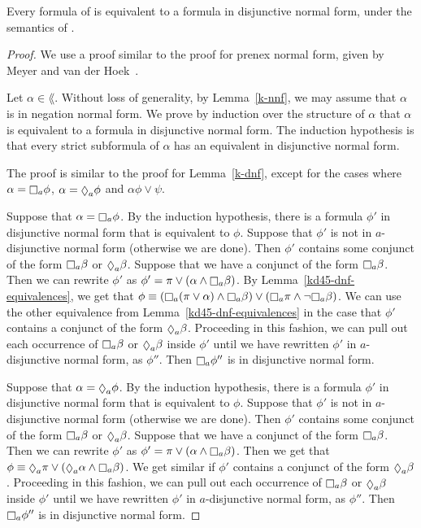 \begin{lemma}\label{kd45-dnf}
Every formula of \lang{} is equivalent to a formula in disjunctive normal form,
under the semantics of \logicKD{}.
\end{lemma}

\begin{proof}
We use a proof similar to the proof for prenex normal form, given by Meyer and
van der Hoek~\cite{meyer2004epistemic}.

Let $\alpha \in \lang$. Without loss of generality, by Lemma~\ref{k-nnf}, we may
assume that $\alpha$ is in negation normal form. We prove by induction over the
structure of $\alpha$ that $\alpha$ is equivalent to a formula in disjunctive
normal form. The induction hypothesis is that every strict subformula of
$\alpha$ has an equivalent in disjunctive normal form.

The proof is similar to the proof for Lemma~\ref{k-dnf}, except for the cases
where $\alpha = \knows_a \phi$, $\alpha = \suspects_a \phi$ and $\alpha \phi
\lor \psi$.

Suppose that $\alpha = \knows_a \phi$. By the induction hypothesis, there is a
formula $\phi'$ in disjunctive normal form that is equivalent to $\phi$. Suppose
that $\phi'$ is not in $a$-disjunctive normal form (otherwise we are done). Then
$\phi'$ contains some conjunct of the form $\knows_a \beta$ or $\suspects_a
\beta$. Suppose that we have a conjunct of the form $\knows_a \beta$. Then we
can rewrite $\phi'$ as $\phi' = \pi \lor (\alpha \land \knows_a \beta)$. By
Lemma~\ref{kd45-dnf-equivalences}, we get that $\phi \equiv (\knows_a (\pi \lor
\alpha) \land \knows_a \beta) \lor (\knows_a \pi \land \neg \knows_a \beta)$.
We can use the other equivalence from Lemma~\ref{kd45-dnf-equivalences} in the
case that $\phi'$ contains a conjunct of the form $\suspects_a \beta$.
Proceeding in this fashion, we can pull out each occurrence of $\knows_a \beta$
or $\suspects_a \beta$ inside $\phi'$ until we have rewritten $\phi'$ in
$a$-disjunctive normal form, as $\phi''$. Then $\knows_a \phi''$ is in
disjunctive normal form.  

Suppose that $\alpha = \suspects_a \phi$. By the induction hypothesis, there is
a formula $\phi'$ in disjunctive normal form that is equivalent to $\phi$.
Suppose that $\phi'$ is not in $a$-disjunctive normal form (otherwise we are
done). Then $\phi'$ contains some conjunct of the form $\knows_a \beta$ or
$\suspects_a \beta$. Suppose that we have a conjunct of the form $\knows_a
\beta$. Then we can rewrite $\phi'$ as $\phi' = \pi \lor (\alpha \land \knows_a
\beta)$. Then we get that $\phi \equiv \suspects_a \pi \lor (\suspects_a \alpha
\land \knows_a \beta)$. We get similar if $\phi'$ contains a conjunct of the
form $\suspects_a \beta$. Proceeding in this fashion, we can pull out each
occurrence of $\knows_a \beta$ or $\suspects_a \beta$ inside $\phi'$ until we
have rewritten $\phi'$ in $a$-disjunctive normal form, as $\phi''$. Then
$\knows_a \phi''$ is in disjunctive normal form.


\end{proof}
